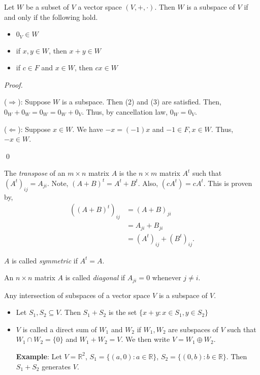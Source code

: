 \documentclass[12pt]{article}
\newenvironment{theorem}[2][Theorem]{\begin{trivlist}
\item[\hskip \labelsep {\bfseries #1}\hskip \labelsep {\bfseries #2.}]}{\end{trivlist}}
\newenvironment{definition}[2][Definition]{\begin{trivlist}
\item[\hskip \labelsep {\bfseries #1}\hskip \labelsep {\bfseries #2}]}{\end{trivlist}}
\newenvironment{sol}
    {\emph{Proof.}
    }
    {
    \qed
    }
\begin{document}
\begin{theorem}{1.3}
Let $W$ be a subset of $V$ a vector space $(V, +, \cdot)$. Then $W$ is a subspace of $V$ if and only if the following hold.
\begin{itemize}
    \item[(1)] $0_V \in W$
    \item[(2)] if $x,y \in W$, then $x + y \in W$
    \item[(3)] if $c \in F$ and $x \in W$, then $cx \in W$
\end{itemize}
\end{theorem}

\begin{sol}
($\Longrightarrow$): Suppose $W$ is a subspace. Then (2) and (3) are satisfied. Then, $0_W + 0_W = 0_W = 0_W + 0_V$. Thus, by cancellation law, $0_W = 0_V$.

($\Longleftarrow$): Suppose $x \in W$. We have $-x = (-1)x$ and $-1 \in F, x \in W$. Thus, $-x \in W$.
\end{sol}

\vspace{1em}

\noindent The \textit{transpose} of an $m \times n$ matrix $A$ is the $n \times m$ matrix $A^t$ such that $(A^t)_{ij} = A_{ji}$. Note, $(A + B)^t = A^t + B^t$. Also, $(cA^t) = cA^t$. This is proven by,
\begin{align*}
    ((A+B)^t)_{ij} &= (A + B)_{ji} \\
    &= A_{ji} + B_{ji} \\
    &= (A^t)_{ij} + (B^t)_{ij}.
\end{align*}

\vspace{1em}

\noindent $A$ is called \textit{symmetric} if $A^t = A$.

\vspace{1em}

\noindent An $n \times n$ matrix $A$ is called \textit{diagonal} if $A_{ji} = 0$ whenever $j \neq i$.

\begin{theorem}{1.4}
Any intersection of subspaces of a vector space $V$ is a subspace of $V$.
\end{theorem}

\begin{definition}{3} \text{ }
\begin{itemize}
    \item Let $S_1, S_2 \subseteq V$. Then $S_1 + S_2$ is the set $\{x + y : x \in S_1, y \in S_2\}$
    \item $V$ is called a direct sum of $W_1$ and $W_2$ if $W_1,W_2$ are subspaces of $V$ such that $W_1 \cap W_2 = \{0\}$ and $W_1 + W_2 = V$. We then write $V = W_1 \oplus W_2$.
    
    \textbf{Example}: Let $V = \mathbb{R}^2$, $S_1 = \{(a,0) : a \in \mathbb{R}\}$, $S_2 = \{(0,b) : b \in \mathbb{R}\}$. Then $S_1 + S_2$ generates $V$.
\end{itemize}
\end{definition}
\end{document}
